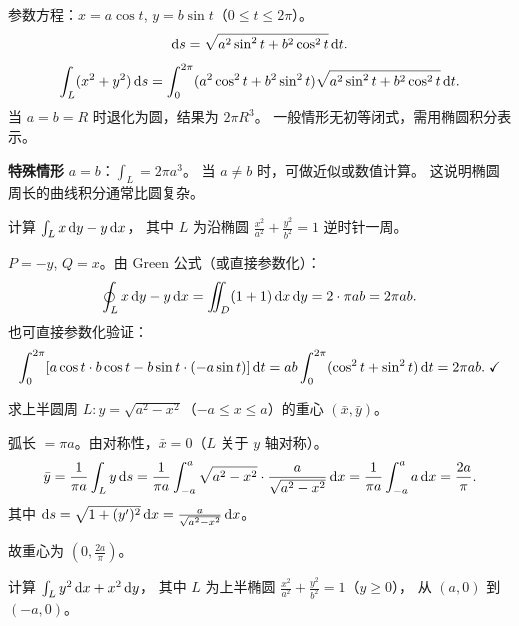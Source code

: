 \documentclass{article}
\begin{document}
\begin{solution}
  参数方程：$x = a\cos t$, $y = b\sin t$（$0 \le t \le 2\pi$）。
  \[
    \mathrm{d} s = \sqrt{a^2\sin^2 t + b^2\cos^2 t}\,\mathrm{d} t.
  \]
  \[
    \int_L (x^2+y^2)\,\mathrm{d} s
    = \int_0^{2\pi} (a^2\cos^2 t + b^2\sin^2 t)
      \sqrt{a^2\sin^2 t + b^2\cos^2 t}\,\mathrm{d} t.
  \]
  当 $a = b = R$ 时退化为圆，结果为 $2\pi R^3$。
  一般情形无初等闭式，需用椭圆积分表示。

  \textbf{特殊情形} $a = b$：$\int_L = 2\pi a^3$。
  当 $a \ne b$ 时，可做近似或数值计算。
  这说明椭圆周长的曲线积分通常比圆复杂。
\end{solution}

\begin{exercise}
  计算 $\int_L x \,\mathrm{d} y - y \,\mathrm{d} x$，
  其中 $L$ 为沿椭圆 $\frac{x^2}{a^2}+\frac{y^2}{b^2}=1$
  逆时针一周。
\end{exercise}

\begin{solution}
  $P = -y$, $Q = x$。由 Green 公式（或直接参数化）：
  \[
    \oint_L x\,\mathrm{d} y - y\,\mathrm{d} x
    = \iint_D (1+1)\,\mathrm{d} x\,\mathrm{d} y = 2\cdot\pi ab = 2\pi ab.
  \]
  也可直接参数化验证：
  \[
    \int_0^{2\pi}[a\cos t\cdot b\cos t - b\sin t\cdot(-a\sin t)]\,\mathrm{d} t
    = ab\int_0^{2\pi}(\cos^2 t+\sin^2 t)\,\mathrm{d} t = 2\pi ab.\;\checkmark
  \]
\end{solution}

\begin{exercise}
  求上半圆周 $L: y = \sqrt{a^2-x^2}$（$-a \le x \le a$）的重心 $(\bar{x}, \bar{y})$。
\end{exercise}

\begin{solution}
  弧长 $= \pi a$。由对称性，$\bar{x} = 0$（$L$ 关于 $y$ 轴对称）。
  \[
    \bar{y} = \frac{1}{\pi a}\int_L y\,\mathrm{d} s
    = \frac{1}{\pi a}\int_{-a}^a \sqrt{a^2-x^2}\cdot\frac{a}{\sqrt{a^2-x^2}}\,\mathrm{d} x
    = \frac{1}{\pi a}\int_{-a}^a a\,\mathrm{d} x
    = \frac{2a}{\pi}.
  \]
  其中 $\mathrm{d} s = \sqrt{1+(y')^2}\,\mathrm{d} x = \frac{a}{\sqrt{a^2-x^2}}\,\mathrm{d} x$。

  故重心为 $(0, \frac{2a}{\pi})$。
\end{solution}

\begin{exercise}
  计算 $\int_L y^2 \,\mathrm{d} x + x^2 \,\mathrm{d} y$，
  其中 $L$ 为上半椭圆 $\frac{x^2}{a^2}+\frac{y^2}{b^2}=1$（$y \ge 0$），
  从 $(a,0)$ 到 $(-a,0)$。
\end{exercise}
\end{document}
